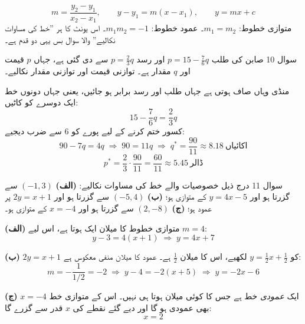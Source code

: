 \begin{nukta}
\[
m=\frac{y_2-y_1}{x_2-x_1},\qquad
y-y_1=m(x-x_1),\qquad
y=mx+c
\]
متوازی خطوط: \(m_1=m_2\)۔ عمود خطوط: \(m_1m_2=-1\)۔
اس یونٹ کا ہر ''خط کی مساوات نکالیے'' والا سوال بس یہی دو قدم ہے۔
\end{nukta}

\begin{sawal}{سوال \textenglish{10}}
صابن کی طلب \(p=15-\tfrac76 q\) اور رسد \(p=\tfrac23 q\) سے دی گئی ہے، جہاں
\(p\) قیمت اور \(q\) مقدار ہے۔ توازنی قیمت اور توازنی مقدار نکالیے۔
\end{sawal}

\begin{hal}
منڈی وہاں صاف ہوتی ہے جہاں طلب اور رسد برابر ہو جائیں، یعنی جہاں دونوں خط ایک
دوسرے کو کاٹیں:
\[
15-\frac76 q=\frac23 q
\]
کسور ختم کرنے کے لیے پورے کو \(6\) سے ضرب دیجیے:
\[
90-7q=4q \;\Longrightarrow\; 90=11q \;\Longrightarrow\;
q^{*}=\frac{90}{11}\approx 8.18 \ \text{اکائیاں}
\]
\[
p^{*}=\frac23\cdot\frac{90}{11}=\frac{60}{11}\approx 5.45 \ \text{ڈالر}
\]

\end{hal}

\begin{sawal}{سوال \textenglish{11}}
درج ذیل خصوصیات والے خط کی مساوات نکالیے:
\textbf{(الف)} \((-1,3)\) سے گزرتا ہو اور \(y=4x-5\) کے متوازی ہو؛
\textbf{(ب)} \((-5,4)\) سے گزرتا ہو اور \(2y=x+1\) پر عمود ہو؛
\textbf{(ج)} \((2,-8)\) سے گزرتا ہو اور \(x=-4\) کے متوازی ہو۔
\end{sawal}

\begin{hal}
\textbf{(الف)} متوازی خطوط کا میلان ایک ہوتا ہے، اس لیے \(m=4\):
\[
y-3=4(x+1) \;\Longrightarrow\; y=4x+7
\]

\textbf{(ب)} \(2y=x+1\) کو \(y=\tfrac12 x+\tfrac12\) لکھیے، اس کا میلان
\(\tfrac12\) ہے۔ عمود کا میلان منفی معکوس ہے:
\[
m=-\frac{1}{1/2}=-2
\;\Longrightarrow\;
y-4=-2(x+5) \;\Longrightarrow\; y=-2x-6
\]

\textbf{(ج)} \(x=-4\) ایک \emph{عمودی} خط ہے جس کا کوئی میلان ہوتا ہی نہیں۔ اس
کے متوازی خط بھی عمودی ہو گا اور دیے گئے نقطے کی \(x\) قدر سے گزرے گا:
\[
x=2
\]

\end{hal}

